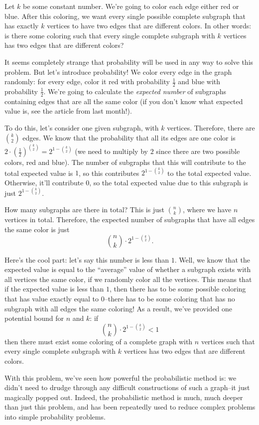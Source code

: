 \documentclass{article}
\begin{document}
Let $k$ be some constant number. We're going to color each edge either red or blue. After this coloring, we want every single possible complete subgraph that has exactly $k$ vertices to have two edges that are different colors. In other words: is there some coloring such that every single complete subgraph with $k$ vertices has two edges that are different colors?

It seems completely strange that probability will be used in any way to solve this problem. But let's introduce probability! We color every edge in the graph randomly: for every edge, color it red with probability $\frac{1}{2}$ and blue with probability $\frac{1}{2}$. We're going to calculate the \emph{expected number} of subgraphs containing edges that are all the same color (if you don't know what expected value is, see the article from last month!).

To do this, let's consider one given subgraph, with $k$ vertices. Therefore, there are $\binom{k}{2}$ edges. We know that the probability that all its edges are one color is $2\cdot\left(\frac{1}{2}\right)^{\binom{k}{2}}=2^{1-\binom{k}{2}}$ (we need to multiply by $2$ since there are two possible colors, red and blue). The number of subgraphs that this will contribute to the total expected value is $1$, so this contributes $2^{1-\binom{k}{2}}$ to the total expected value. Otherwise, it'll contribute $0$, so the total expected value due to this subgraph is just $2^{1-\binom{k}{2}}$.

How many subgraphs are there in total? This is just $\binom{n}{k}$, where we have $n$ vertices in total. Therefore, the expected number of subgraphs that have all edges the same color is just
\[\binom{n}{k}\cdot 2^{1-\binom{k}{2}}.\]

Here's the cool part: let's say this number is less than $1$. Well, we know that the expected value is equal to the ``average'' value of whether a subgraph exists with all vertices the same color, if we randomly color all the vertices. This means that if the expected value is less than $1$, then there has to be some possible coloring that has value exactly equal to $0$--there has to be some coloring that has no subgraph with all edges the same coloring! As a result, we've provided one potential bound for $n$ and $k$: if
\[\binom{n}{k}\cdot 2^{1-\binom{k}{2}}<1\]
then there must exist some coloring of a complete graph with $n$ vertices such that every single complete subgraph with $k$ vertices has two edges that are different colors.

With this problem, we've seen how powerful the probabilistic method is: we didn't need to drudge through any difficult constructions of such a graph--it just magically popped out. Indeed, the probabilistic method is much, much deeper than just this problem, and has been repeatedly used to reduce complex problems into simple probability problems.
\end{document}
